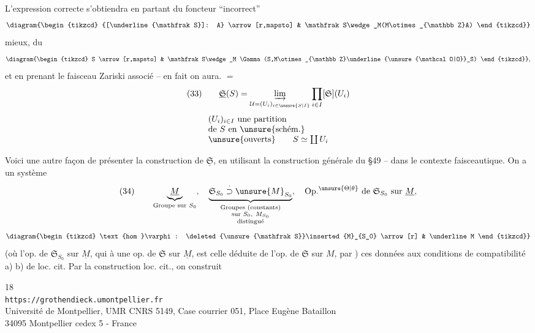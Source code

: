 L'expression correcte s'obtiendra en partant du  foncteur ``incorrect''
\[
\diagram{\begin{tikzcd}
{[\underline{\mathfrak S}]: A} \arrow[r,mapsto] &
\mathfrak S\wedge_M(M\otimes_{\mathbb Z}A)
\end{tikzcd}}
\]
 mieux, du 
\[
\diagram{\begin{tikzcd}
S \arrow[r,mapsto] &
\mathfrak S\wedge_M
\Gamma(S,M\otimes_{\mathbb Z}\underline{\unsure{\mathcal O|O}}_S)
\end{tikzcd}},
\]
et en prenant le faisceau Zariski associé -- en fait on aura. $=$
\[
(33)\qquad
\underline{\mathfrak S}(S)=
\underset{\mathcal U=(U_i)_{i\in\unsure{S|I}}}{\varinjlim}
\prod_{i\in I}[\mathfrak S](U_i)
\]
\[
\begin{array}{l}
(U_i)_{i\in I}\ \text{une partition}\\
\text{de }S\text{ en }\unsure{\text{schém.}}\\
\unsure{\text{ouverts}}\qquad S\simeq\coprod U_i
\end{array}
\]

Voici une autre façon de présenter la construction de
$\underline{\mathfrak S}$, en utilisant la construction générale
du §49 -- dans le contexte faisceautique. On a un système
\[
(34)\qquad
\underbrace{\underline M}_{\text{Groupe sur }S_0},
\quad
\underbrace{\mathfrak S_{S_0}
\overset{\cdot}{\supset}\unsure{M}_{S_0}}_{
\substack{\text{Groupes (constants)}\\
\text{sur }S_0,\ M_{S_0}\\
\text{distingué}}},
\quad
\mathrm{Op.}^{\unsure{\Theta|\theta}}\text{ de }
\mathfrak S_{S_0}\text{ sur }\underline M,
\]
\[
\diagram{\begin{tikzcd}
\text{hom }\varphi:
\deleted{\unsure{\mathfrak S}}\inserted{M}_{S_0}
\arrow[r] & \underline M
\end{tikzcd}}
\]
(où l'op. de $\mathfrak S_{S_0}$ sur $\underline M$,
qui  à une op. de $\mathfrak S$ sur $\underline M$,
est celle déduite de l'op. de $\mathfrak S$ sur $M$,
par )
ces données  aux conditions de compatibilité a) b)
de loc. cit. Par la construction  loc. cit., on construit

\begin{center}
\small
18\\
\texttt{https://grothendieck.umontpellier.fr}\\
Université de Montpellier, UMR CNRS 5149, Case courrier 051, Place Eugène Bataillon\\
34095 Montpellier cedex 5 - France
\end{center}

